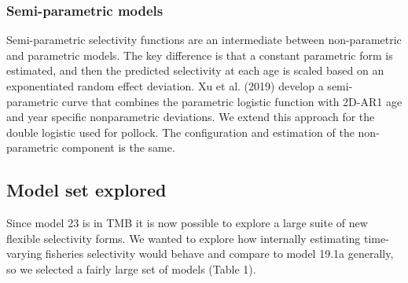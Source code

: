 \documentclass[
]{article}
\begin{document}
\hypertarget{semi-parametric-models}{%
\subsubsection{Semi-parametric models}\label{semi-parametric-models}}

Semi-parametric selectivity functions are an intermediate between
non-parametric and parametric models. The key difference is that a
constant parametric form is estimated, and then the predicted
selectivity at each age is scaled based on an exponentiated random
effect deviation. Xu et al. (2019) develop a semi-parametric curve that
combines the parametric logistic function with 2D-AR1 age and year
specific nonparametric deviations. We extend this approach for the
double logistic used for pollock. The configuration and estimation of
the non-parametric component is the same.

\hypertarget{model-set-explored}{%
\subsection{Model set explored}\label{model-set-explored}}

Since model 23 is in TMB it is now possible to explore a large suite of
new flexible selectivity forms. We wanted to explore how internally
estimating time-varying fisheries selectivity would behave and compare
to model 19.1a generally, so we selected a fairly large set of models
(Table 1).
\end{document}
